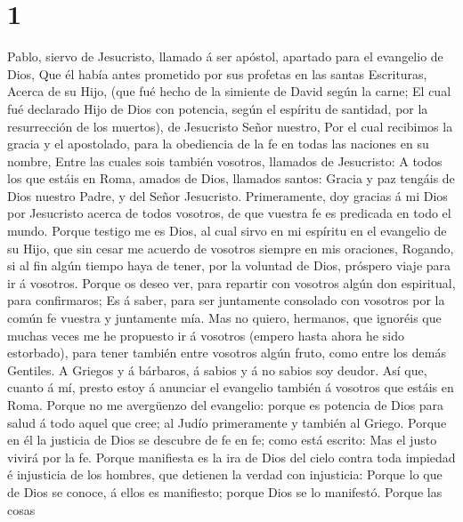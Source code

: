 \hypertarget{section}{%
\section{1}\label{section}}

 Pablo, siervo de Jesucristo, llamado á ser apóstol,
apartado para el evangelio de Dios,  Que él había antes
prometido por sus profetas en las santas Escrituras,  Acerca
de su Hijo, (que fué hecho de la simiente de David según la carne;
 El cual fué declarado Hijo de Dios con potencia, según el
espíritu de santidad, por la resurrección de los muertos), de Jesucristo
Señor nuestro,  Por el cual recibimos la gracia y el
apostolado, para la obediencia de la fe en todas las naciones en su
nombre,  Entre las cuales sois también vosotros, llamados de
Jesucristo:  A todos los que estáis en Roma, amados de Dios,
llamados santos: Gracia y paz tengáis de Dios nuestro Padre, y del Señor
Jesucristo.  Primeramente, doy gracias á mi Dios por
Jesucristo acerca de todos vosotros, de que vuestra fe es predicada en
todo el mundo.  Porque testigo me es Dios, al cual sirvo en
mi espíritu en el evangelio de su Hijo, que sin cesar me acuerdo de
vosotros siempre en mis oraciones,  Rogando, si al fin
algún tiempo haya de tener, por la voluntad de Dios, próspero viaje para
ir á vosotros.  Porque os deseo ver, para repartir con
vosotros algún don espiritual, para confirmaros;  Es á
saber, para ser juntamente consolado con vosotros por la común fe
vuestra y juntamente mía.  Mas no quiero, hermanos, que
ignoréis que muchas veces me he propuesto ir á vosotros (empero hasta
ahora he sido estorbado), para tener también entre vosotros algún fruto,
como entre los demás Gentiles.  A Griegos y á bárbaros, á
sabios y á no sabios soy deudor.  Así que, cuanto á mí,
presto estoy á anunciar el evangelio también á vosotros que estáis en
Roma.  Porque no me avergüenzo del evangelio: porque es
potencia de Dios para salud á todo aquel que cree; al Judío primeramente
y también al Griego.  Porque en él la justicia de Dios se
descubre de fe en fe; como está escrito: Mas el justo vivirá por la fe.
 Porque manifiesta es la ira de Dios del cielo contra toda
impiedad é injusticia de los hombres, que detienen la verdad con
injusticia:  Porque lo que de Dios se conoce, á ellos es
manifiesto; porque Dios se lo manifestó.  Porque las cosas
